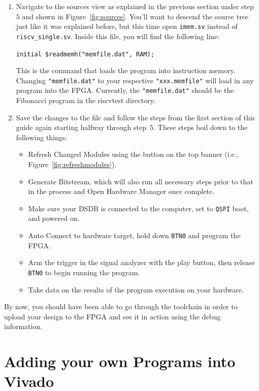 \documentclass{article}
\begin{document}
\begin{enumerate}
\item Navigate to the sources view as explained in the previous section under
step~$5$ and shown in Figure~\ref{fig:sources}.  You'll want to descend the source
tree just like it was explained before, but this time open \verb|imem.sv| instead
of \verb|riscv_single.sv|.  Inside this file, you will find the following line:

\verb|initial $readmemh("memfile.dat", RAM);|

This is the command that loads the program into instruction memory.  Changing
\verb|"memfile.dat"| to your respective \verb|"xxx.memfile"| will load in any program
into the FPGA.  Currently, the \verb|"memfile.dat"| should be the
Fibonacci program in the riscvtest directory.

\item Save the changes to the file and follow the steps from the first section
of this guide again starting halfway through step~$5$.  These steps boil down to
the following things:
\begin{itemize}
\item Refresh Changed Modules using the button on the top banner
  (i.e., Figure~\ref{fig:refreshmodules}).
  
\item Generate Bitstream, which will also run all necessary steps prior to
  that in the process and Open Hardware Manager once complete.
  
\item Make sure your DSDB is connected to the computer, set to \verb|QSPI|
  boot, and powered on.
  
\item Auto Connect to hardware target, hold down \verb|BTN0| and program
  the FPGA.
  
\item Arm the trigger in the signal analyzer with the play button, then
  release \verb|BTN0| to begin running the program.
  
\item Take data on the results of the program execution on your hardware.
\end{itemize}
\end{enumerate}
By now, you should have been able to go through the
toolchain in order to upload your design to the FPGA and see it in
action using the debug information.

\section{Adding your own Programs into Vivado}
\end{document}
